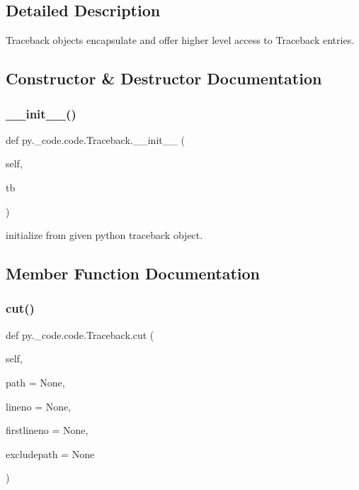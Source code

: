 \subsection{Detailed Description}
\begin{DoxyVerb}Traceback objects encapsulate and offer higher level
    access to Traceback entries.
\end{DoxyVerb}
 

\subsection{Constructor \& Destructor Documentation}
\mbox{\label{classpy_1_1__code_1_1code_1_1_traceback_aea2d1409a245794eca62d80884520590}} 
\subsubsection{\texorpdfstring{\+\_\+\+\_\+init\+\_\+\+\_\+()}{\_\_init\_\_()}}
{\footnotesize\ttfamily def py.\+\_\+code.\+code.\+Traceback.\+\_\+\+\_\+init\+\_\+\+\_\+ (\begin{DoxyParamCaption}\item[{}]{self,  }\item[{}]{tb }\end{DoxyParamCaption})}

\begin{DoxyVerb}initialize from given python traceback object. \end{DoxyVerb}
 

\subsection{Member Function Documentation}
\mbox{\label{classpy_1_1__code_1_1code_1_1_traceback_a71ca463717ecf011836e62ad25db4a73}} 
\subsubsection{\texorpdfstring{cut()}{cut()}}
{\footnotesize\ttfamily def py.\+\_\+code.\+code.\+Traceback.\+cut (\begin{DoxyParamCaption}\item[{}]{self,  }\item[{}]{path = {\ttfamily None},  }\item[{}]{lineno = {\ttfamily None},  }\item[{}]{firstlineno = {\ttfamily None},  }\item[{}]{excludepath = {\ttfamily None} }\end{DoxyParamCaption})}

